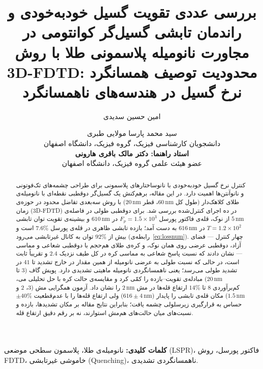 \documentclass[12pt,a4paper]{article}
\newcommand{\Fp}{F_p}
\newcommand{\nm}[1]{#1\,\text{nm}}
\begin{document}
\title{بررسی عددی تقویت گسیل خودبه‌خودی و راندمان تابشی گسیل‌گر
کوانتومی در مجاورت نانومیله پلاسمونی طلا با روش 3D-FDTD:
محدودیت توصیف همسانگرد نرخ گسیل در هندسه‌های ناهمسانگرد}

\author{امین حسین سدیدی \and سید محمد پارسا مولایی طبری\\[0.3em]
  \normalsize دانشجویان کارشناسی فیزیک، گروه فیزیک، دانشگاه اصفهان\\[0.9em]
  \normalsize\textbf{استاد راهنما: دکتر مالک باقری هارونی}\\[0.2em]
  \normalsize عضو هیئت علمی گروه فیزیک، دانشگاه اصفهان}
\date{}
\maketitle

\begin{abstract}
کنترل نرخ گسیل خودبه‌خودی با نانوساختارهای پلاسمونی برای طراحی چشمه‌های
تک‌فوتونی و نانوآنتن‌ها اهمیت دارد. در این مقاله، برهم‌کنش یک گسیل‌گر
دوقطبی نقطه‌ای با نانومیله‌ی طلای کلاهک‌دار (طول کل $\nm{60}$، قطر
$\nm{20}$) با روش سه‌بعدی تفاضل محدود در حوزه‌ی زمان (3D-FDTD) در ده
اجرای کنترل‌شده بررسی شد. برای دوقطبی طولی در فاصله‌ی $\nm{5}$ از نوک،
قله‌ی فاکتور پورسل $\Fp = 1.5\times10^{3}$ در $\nm{610}$ و بیشینه‌ی
تقویت توان تابشی $T = 1.2\times10^{2}$ در $\nm{616}$ به دست آمد؛ بازده
تابشی ظاهری در قله‌ی پورسل $7.6\%$ است و بیش از $92\%$ توان به کانال
غیرتابشی می‌رود (رابطه‌ی~\eqref{eq:lossnum}). چهار کنترل — فضای آزاد،
دوقطبی عرضی روی همان نوک، و کره‌ی طلای هم‌حجم با دوقطبی شعاعی و مماسی —
نشان دادند که نسبت پاسخ شعاعی به مماسی کره در کل طیف نزدیک $2.4$ و
تقریباً ثابت است، در حالی که نسبت طولی به عرضی نانومیله از همین مقدار
در خارج تشدید تا $41$ در تشدید طولی می‌رسد؛ یعنی ناهمسانگردی نانومیله
ماهیتی تشدیدی دارد. پویش گاف ($3$ تا $\nm{20}$) مبادله‌ی تقویت–بازده را
کمّی کرد و مقایسه‌ی حالت کره با حل تحلیلی می، کم‌برآوردی $8$ تا $14\%$
ارتفاع قله‌ها در مش $\nm{2}$ را نشان داد. آزمون همگرایی مش ($3$، $2$ و
$\nm{1.5}$) مکان قله‌ی تابشی را پایدار ($616\pm\nm{4}$) ولی ارتفاع
قله‌ها را با عدم‌قطعیت $\pm40\%$ حساس به قرارگیری زیرسلولی چشمه یافت؛
بنابراین نتایج مقاله بر مکان تشدیدها، بازده و نسبت‌های میان حالت‌های
هم‌مش استوارند، نه بر رقم دقیق ارتفاع قله.
\end{abstract}

\noindent\textbf{کلمات کلیدی:} نانومیله‌ی طلا، پلاسمون سطحی موضعی (LSPR)،
فاکتور پورسل، روش FDTD، خاموشی غیرتابشی (Quenching)، ناهمسانگردی تشدیدی.

\bigskip








\printbibliography[title={مراجع}]
\end{document}
